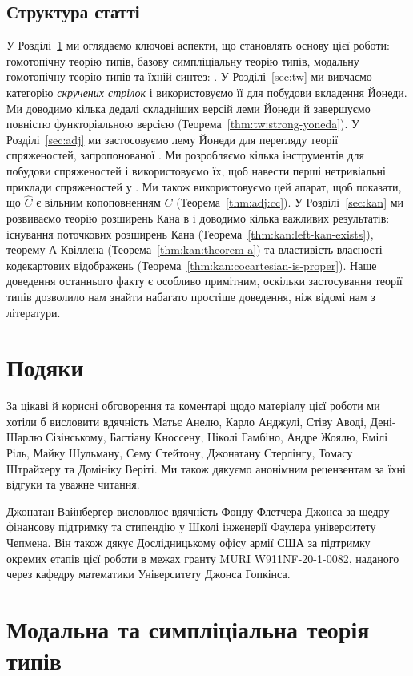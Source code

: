 \documentclass[12pt]{article}
\newcommand{\textcite}{\cite}
\newcommand{\PSH}[1]{\widehat{#1}}
\begin{document}
\subsection{Структура статті}
У Розділі~\ref{sec:prelims} ми оглядаємо ключові аспекти, що становлять основу цієї роботи: гомотопічну теорію типів, базову симпліціальну теорію типів, модальну гомотопічну теорію типів та їхній синтез: \STT{}. У Розділі~\ref{sec:tw} ми вивчаємо категорію \emph{скручених стрілок} і використовуємо її для побудови вкладення Йонеди. Ми доводимо кілька дедалі складніших версій леми Йонеди й завершуємо повністю функторіальною версією (Теорема~\ref{thm:tw:strong-yoneda}). У Розділі~\ref{sec:adj} ми застосовуємо лему Йонеди для перегляду теорії спряженостей, запропонованої \textcite{riehl:2017}. Ми розробляємо кілька інструментів для побудови спряженостей і використовуємо їх, щоб навести перші нетривіальні приклади спряженостей у \STT{}. Ми також використовуємо цей апарат, щоб показати, що $\PSH{C}$ є вільним копоповненням $C$ (Теорема~\ref{thm:adj:cc}). У Розділі~\ref{sec:kan} ми розвиваємо теорію розширень Кана в \STT{} і доводимо кілька важливих результатів: існування поточкових розширень Кана (Теорема~\ref{thm:kan:left-kan-exists}), теорему А Квіллена (Теорема~\ref{thm:kan:theorem-a}) та властивість власності кодекартових відображень (Теорема~\ref{thm:kan:cocartesian-is-proper}). Наше доведення останнього факту є особливо примітним, оскільки застосування теорії типів дозволило нам знайти набагато простіше доведення, ніж відомі нам з літератури.

\section*{Подяки}
За цікаві й корисні обговорення та коментарі щодо матеріалу цієї роботи ми хотіли б висловити вдячність
%
Матьє Анелю,
Карло Анджулі,
Стіву Аводі,
Дені-Шарлю Сізінському,
Бастіану Кноссену,
Ніколі Гамбіно,
Андре Жоялю,
Емілі Ріль,
Майку Шульману,
Сему Стейтону,
Джонатану Стерлінгу,
Томасу Штрайхеру
та Домініку Веріті.
%
Ми також дякуємо анонімним рецензентам за їхні відгуки та уважне читання.

Джонатан Вайнбергер висловлює вдячність Фонду Флетчера Джонса за щедру фінансову підтримку та стипендію у Школі інженерії Фаулера університету Чепмена. Він також дякує Дослідницькому офісу армії США за підтримку окремих етапів цієї роботи в межах гранту MURI W911NF-20-1-0082, наданого через кафедру математики Університету Джонса Гопкінса.
\section{Модальна та симпліціальна теорія типів}
\label{sec:prelims}
\end{document}
